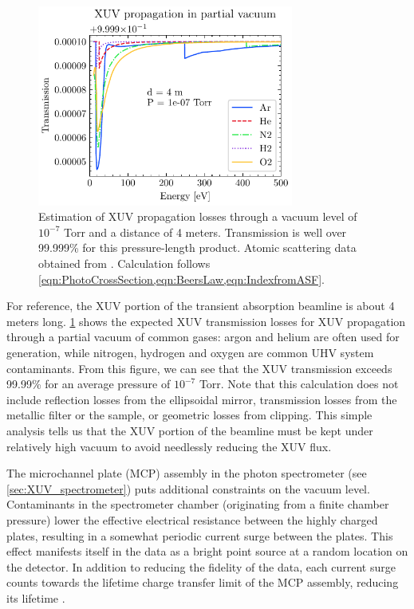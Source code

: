 \begin{figure}
	\centering
	\includegraphics[width=0.75\textwidth]{figures/chap2/XUVinVacuum.pdf}
	\caption{Estimation of XUV propagation losses through a vacuum level of $10^{-7}$ Torr and a distance of 4 meters. Transmission is well over 99.999\% for this pressure-length product. Atomic scattering data obtained from \cite{gulliksonCXROXRayInteractions,henkeXRayInteractionsPhotoabsorption1993}. Calculation follows \cref{eqn:PhotoCrossSection,eqn:BeersLaw,eqn:IndexfromASF}.}
	\label{fig:XUVinVacuum}
\end{figure}

For reference, the XUV portion of the transient absorption beamline is about 4 meters long. \cref{fig:XUVinVacuum} shows the expected XUV transmission losses for XUV propagation through a partial vacuum of common gases: argon and helium are often used for generation, while nitrogen, hydrogen and oxygen are common UHV system contaminants. From this figure, we can see that the XUV transmission exceeds 99.99\% for an average pressure of $10^{-7}$ Torr. Note that this calculation does not include reflection losses from the ellipsoidal mirror, transmission losses from the metallic filter or the sample, or geometric losses from clipping. This simple analysis tells us that the XUV portion of the beamline must be kept under relatively high vacuum to avoid needlessly reducing the XUV flux.

The microchannel plate (MCP) assembly in the photon spectrometer (see \cref{sec:XUV_spectrometer}) puts additional constraints on the vacuum level.  Contaminants in the spectrometer chamber (originating from a finite chamber pressure) lower the effective electrical resistance between the highly charged plates, resulting in a somewhat periodic current surge between the plates. This effect manifests itself in the data as a bright point source at a random location on the detector. In addition to reducing the fidelity of the data, each current surge counts towards the lifetime charge transfer limit of the MCP assembly, reducing its lifetime \cite{ladislaswizaMicrochannelPlateDetectors1979}.

